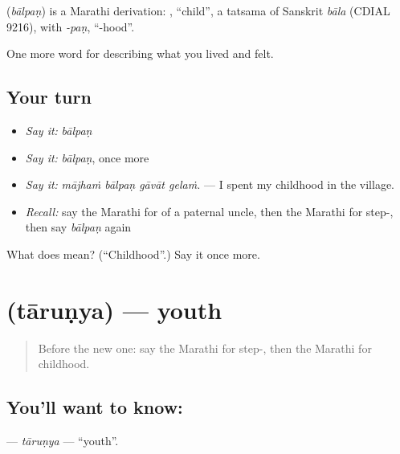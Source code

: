 \begin{cousinweb}
\textbf{} (\emph{bālpaṇ}) is a Marathi derivation: , \textquotedblleft{}child\textquotedblright{}, a tatsama of Sanskrit \emph{bāla} (CDIAL 9216), with \emph{-paṇ}, \textquotedblleft{}-hood\textquotedblright{}.
\end{cousinweb}

\begin{grammarlens}[title={What you've built}]
One more word for describing what you lived and felt.
\end{grammarlens}

\subsection*{Your turn}
\begin{itemize}
\raggedright
  \item \emph{Say it:} \emph{bālpaṇ}
  \item \emph{Say it:} \emph{bālpaṇ}, once more
  \item \emph{Say it:} \emph{mājhaṁ bālpaṇ gāvāt gelaṁ.} — I spent my childhood in the village.
  \item \emph{Recall:} say the Marathi for of a paternal uncle, then the Marathi for step-, then say \emph{bālpaṇ} again
\end{itemize}

\begin{tcolorbox}[breakable,colback=teal!4,colframe=teal!35!black,title={Before you move on}]
What does  mean? (\textquotedblleft{}Childhood\textquotedblright{}.) Say it once more.
\end{tcolorbox}
\section[\texorpdfstring{\mr{तारुण्य} (tāruṇya)}{तारुण्य (tāruṇya)}]{ (tāruṇya) — youth}

\label{lesson:MR-C498-tarunya}



\begin{quote}
Before the new one: say the Marathi for step-, then the Marathi for childhood.
\end{quote}

\subsection*{You'll want to know: }
\textbf{} — \emph{tāruṇya} — \textquotedblleft{}youth\textquotedblright{}.

